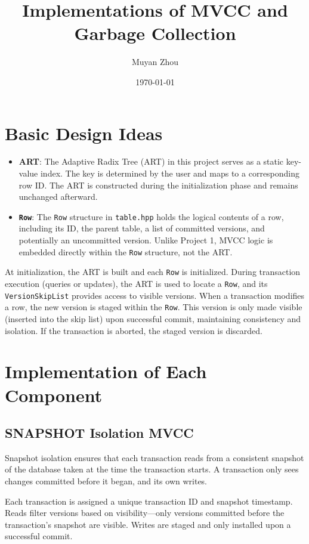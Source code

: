\documentclass{article}
\title{Implementations of MVCC and Garbage Collection}
\author{Muyan Zhou}
\date{\today}
\begin{document}
\maketitle

\section{Basic Design Ideas}
\begin{itemize}
    \item \textbf{ART}: The Adaptive Radix Tree (ART) in this project serves as a static key-value index. The key is determined by the user and maps to a corresponding row ID. The ART is constructed during the initialization phase and remains unchanged afterward.
    
    \item \textbf{\texttt{Row}}: The \texttt{Row} structure in \texttt{table.hpp} holds the logical contents of a row, including its ID, the parent table, a list of committed versions, and potentially an uncommitted version. Unlike Project 1, MVCC logic is embedded directly within the \texttt{Row} structure, not the ART.
\end{itemize}

At initialization, the ART is built and each \texttt{Row} is initialized. During transaction execution (queries or updates), the ART is used to locate a \texttt{Row}, and its \texttt{VersionSkipList} provides access to visible versions. When a transaction modifies a row, the new version is staged within the \texttt{Row}. This version is only made visible (inserted into the skip list) upon successful commit, maintaining consistency and isolation. If the transaction is aborted, the staged version is discarded.

\section{Implementation of Each Component}

\subsection{SNAPSHOT Isolation MVCC}
Snapshot isolation ensures that each transaction reads from a consistent snapshot of the database taken at the time the transaction starts. A transaction only sees changes committed before it began, and its own writes.

Each transaction is assigned a unique transaction ID and snapshot timestamp. Reads filter versions based on visibility—only versions committed before the transaction’s snapshot are visible. Writes are staged and only installed upon a successful commit. 
\end{document}
